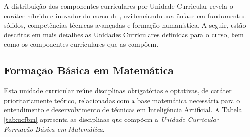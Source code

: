 A distribuição dos componentes curriculares por Unidade Curricular revela o caráter híbrido e inovador do curso de \nomedocurso, evidenciando sua ênfase em fundamentos sólidos, competências técnicas avançadas e formação humanística.  
A seguir, estão descritas em mais detalhes as Unidades Curriculares definidas para o curso, bem como os componentes curriculares que as compõem.

\subsection{Formação Básica em Matemática}

Esta unidade curricular reúne disciplinas obrigatórias e optativas, de caráter prioritariamente teórico, relacionadas com a base matemática necessária para o entendimento e desenvolvimento de técnicas em Inteligência Artificial. A Tabela \ref{tab:ucfbm} apresenta as disciplinas que compõem a \textit{Unidade Curricular Formação Básica em Matemática}.


